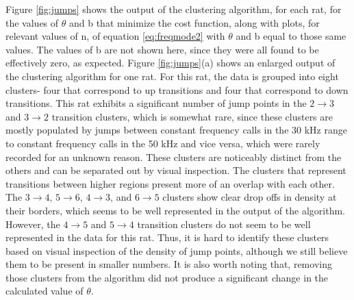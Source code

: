 \documentclass[twocolumn, prl]{revtex4}
\begin{document}
Figure \ref{fig:jumps} shows the output of the clustering algorithm, for each rat, for the values of $\theta$ and b that minimize the cost function, along with plots, for relevant values of n, of equation \ref{eq:freqmode2} with $\theta$ and b equal to those same values. The values of b are not shown here, since they were all found to be effectively zero, as expected. Figure \ref{fig:jumps}(a) shows an enlarged output of the clustering algorithm for one rat. For this rat, the data is grouped into eight clusters- four that correspond to up transitions and four that correspond to down transitions. This rat exhibits a significant number of jump points in the $2\rightarrow3$ and $3\rightarrow2$ transition clusters, which is somewhat rare, since these clusters are mostly populated by jumps between constant frequency calls in the 30 kHz range to constant frequency calls in the 50 kHz and vice versa, which were rarely recorded for an unknown reason. These clusters are noticeably distinct from the others and can be separated out by visual inspection. The clusters that represent transitions between higher regions present more of an overlap with each other. The $3\rightarrow4$, $5\rightarrow6$, $4\rightarrow3$, and $6\rightarrow5$ clusters show clear drop offs in density at their borders, which seems to be well represented in the output of the algorithm. However, the $4\rightarrow5$ and $5\rightarrow4$ transition clusters do not seem to be well represented in the data for this rat. Thus, it is hard to identify these clusters based on visual inspection of the density of jump points, although we still believe them to be present in smaller numbers. It is also worth noting that, removing those clusters from the algorithm did not produce a significant change in the calculated value of $\theta$. 
\end{document}
